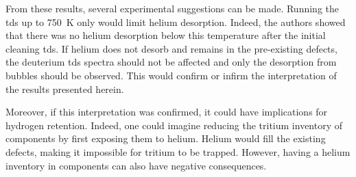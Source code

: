 From these results, several experimental suggestions can be made.
Running the \gls{tds} up to \SI{750}{K} only would limit helium desorption.
Indeed, the authors \cite{ialovega_hydrogen_2020} showed that there was no helium desorption below this temperature after the initial cleaning \gls{tds}.
If helium does not desorb and remains in the pre-existing defects, the deuterium \gls{tds} spectra should not be affected and only the desorption from bubbles should be observed.
This would confirm or infirm the interpretation of the results presented herein.

Moreover, if this interpretation was confirmed, it could have implications for hydrogen retention.
Indeed, one could imagine reducing the tritium inventory of components by first exposing them to helium.
Helium would fill the existing defects, making it impossible for tritium to be trapped.
However, having a helium inventory in components can also have negative consequences.
